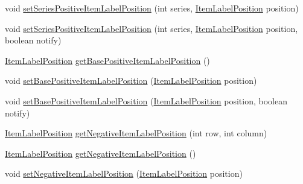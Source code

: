 \begin{DoxyCompactItemize}
\item 
void \mbox{\hyperlink{interfaceorg_1_1jfree_1_1chart_1_1renderer_1_1category_1_1_category_item_renderer_aa18ccd691341104faff52214b09a288e}{set\+Series\+Positive\+Item\+Label\+Position}} (int series, \mbox{\hyperlink{classorg_1_1jfree_1_1chart_1_1labels_1_1_item_label_position}{Item\+Label\+Position}} position)
\item 
void \mbox{\hyperlink{interfaceorg_1_1jfree_1_1chart_1_1renderer_1_1category_1_1_category_item_renderer_a6d26bf09dd9cf15bf416dbd2d897e8ba}{set\+Series\+Positive\+Item\+Label\+Position}} (int series, \mbox{\hyperlink{classorg_1_1jfree_1_1chart_1_1labels_1_1_item_label_position}{Item\+Label\+Position}} position, boolean notify)
\item 
\mbox{\hyperlink{classorg_1_1jfree_1_1chart_1_1labels_1_1_item_label_position}{Item\+Label\+Position}} \mbox{\hyperlink{interfaceorg_1_1jfree_1_1chart_1_1renderer_1_1category_1_1_category_item_renderer_aa447d7a69c2ceeed6c734eae9cb995f3}{get\+Base\+Positive\+Item\+Label\+Position}} ()
\item 
void \mbox{\hyperlink{interfaceorg_1_1jfree_1_1chart_1_1renderer_1_1category_1_1_category_item_renderer_accee047a54e3074df84312e1cee05f75}{set\+Base\+Positive\+Item\+Label\+Position}} (\mbox{\hyperlink{classorg_1_1jfree_1_1chart_1_1labels_1_1_item_label_position}{Item\+Label\+Position}} position)
\item 
void \mbox{\hyperlink{interfaceorg_1_1jfree_1_1chart_1_1renderer_1_1category_1_1_category_item_renderer_a381bd061c04dfb2cee72de5b5a80d7fe}{set\+Base\+Positive\+Item\+Label\+Position}} (\mbox{\hyperlink{classorg_1_1jfree_1_1chart_1_1labels_1_1_item_label_position}{Item\+Label\+Position}} position, boolean notify)
\item 
\mbox{\hyperlink{classorg_1_1jfree_1_1chart_1_1labels_1_1_item_label_position}{Item\+Label\+Position}} \mbox{\hyperlink{interfaceorg_1_1jfree_1_1chart_1_1renderer_1_1category_1_1_category_item_renderer_aa633168ae04a5ff47ae98ecd7cf1f497}{get\+Negative\+Item\+Label\+Position}} (int row, int column)
\item 
\mbox{\hyperlink{classorg_1_1jfree_1_1chart_1_1labels_1_1_item_label_position}{Item\+Label\+Position}} \mbox{\hyperlink{interfaceorg_1_1jfree_1_1chart_1_1renderer_1_1category_1_1_category_item_renderer_a3e5a51575b8547693b2ad6a91d2a1fce}{get\+Negative\+Item\+Label\+Position}} ()
\item 
void \mbox{\hyperlink{interfaceorg_1_1jfree_1_1chart_1_1renderer_1_1category_1_1_category_item_renderer_acda1ea9e4c2f56fd66994a59c0f4c60a}{set\+Negative\+Item\+Label\+Position}} (\mbox{\hyperlink{classorg_1_1jfree_1_1chart_1_1labels_1_1_item_label_position}{Item\+Label\+Position}} position)

\end{DoxyCompactItemize}
